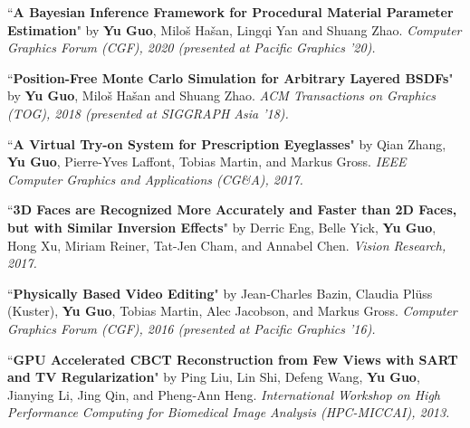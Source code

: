 \documentclass[margin,line]{resume}
\begin{document}
\begin{resume}
    \vspace{-5mm}

    ``\textbf{A Bayesian Inference Framework for Procedural Material Parameter Estimation}" 
    by \textbf{Yu Guo}, Milo\v{s} Ha\v{s}an, Lingqi Yan and Shuang Zhao. 
    \textsl{Computer Graphics Forum (CGF), 2020 (presented at Pacific Graphics '20).}\\
    
    \vspace{-5mm}

    ``\textbf{Position-Free Monte Carlo Simulation for Arbitrary Layered BSDFs}" 
    by \textbf{Yu Guo}, Milo\v{s} Ha\v{s}an and Shuang Zhao. 
    \textsl{ACM Transactions on Graphics (TOG), 2018 (presented at SIGGRAPH Asia '18).}\\
    
    \vspace{-5mm}
    
    ``\textbf{A Virtual Try-on System for Prescription Eyeglasses}" 
    by Qian Zhang, \textbf{Yu Guo}, Pierre-Yves Laffont, Tobias Martin, and Markus Gross. 
    \textsl{IEEE Computer Graphics and Applications (CG\&A), 2017.}\\

    \vspace{-5mm}

    ``\textbf{3D Faces are Recognized More Accurately and Faster than 2D Faces, but with Similar Inversion Effects}" 
    by Derric Eng, Belle Yick, \textbf{Yu Guo}, Hong Xu, Miriam Reiner, Tat-Jen Cham, and Annabel Chen. 
    \textsl{Vision Research, 2017.}\\

    \vspace{-5mm}

    ``\textbf{Physically Based Video Editing}" 
    by Jean-Charles Bazin, Claudia Pl\"{u}ss (Kuster), \textbf{Yu Guo}, Tobias Martin, Alec Jacobson, and Markus Gross. 
    \textsl{Computer Graphics Forum (CGF), 2016 (presented at Pacific Graphics '16).}\\

    \vspace{-5mm}

    ``\textbf{GPU Accelerated CBCT Reconstruction from Few Views with SART and TV Regularization}" 
    by Ping Liu, Lin Shi, Defeng Wang, \textbf{Yu Guo}, Jianying Li, Jing Qin, and Pheng-Ann Heng. 
    \textsl{International Workshop on High Performance Computing for Biomedical Image Analysis (HPC-MICCAI), 2013.}\\


\end{resume}
\end{document}
